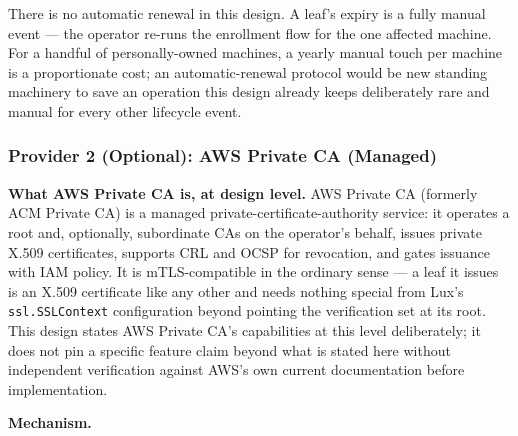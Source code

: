 \documentclass[a4paper,10pt]{article}
\newcommand{\field}[1]{\texttt{#1}}
\begin{document}
There is no automatic renewal in this design.  A leaf's expiry is a fully
manual event --- the operator re-runs the enrollment flow for the one
affected machine.  For a handful of personally-owned machines, a yearly
manual touch per machine is a proportionate cost; an automatic-renewal
protocol would be new standing machinery to save an operation this design
already keeps deliberately rare and manual for every other lifecycle
event.

\subsubsection{Provider 2 (Optional): AWS Private CA (Managed)}\label{sec:crosshost-enroll-aws}

\textbf{What AWS Private CA is, at design level.}  AWS Private CA
(formerly ACM Private CA) is a managed private-certificate-authority
service: it operates a root and, optionally, subordinate CAs on the
operator's behalf, issues private X.509 certificates, supports CRL
and OCSP for revocation, and gates issuance with IAM
policy.  It is mTLS-compatible in the ordinary sense --- a leaf it issues
is an X.509 certificate like any other and needs nothing special from
Lux's \field{ssl.SSLContext} configuration beyond pointing the
verification set at its root.  This design states AWS Private CA's
capabilities at this level deliberately; it does not pin a specific
feature claim beyond what is stated here without independent
verification against AWS's own current documentation before
implementation.

\textbf{Mechanism.}
\end{document}
